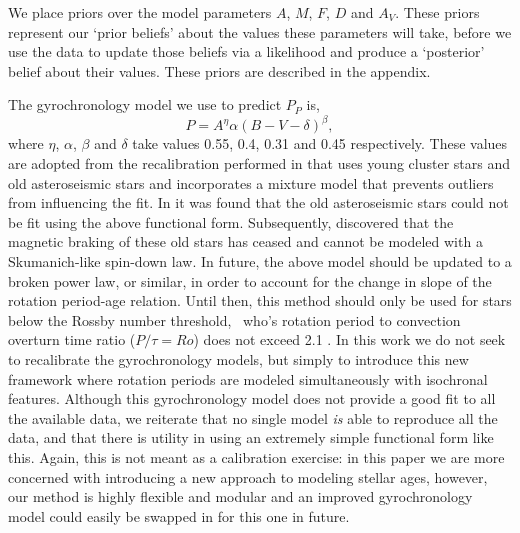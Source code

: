 We place priors over the model parameters $A$, $M$, $F$, $D$ and $A_V$.
These priors represent our `prior beliefs' about the values these parameters
will take, before we use the data to update those beliefs via a likelihood and
produce a `posterior' belief about their values.
These priors are described in the appendix.

The gyrochronology model we use to predict $P_P$ is, %
\begin{equation}
    P = A^\eta \alpha (B-V - \delta)^\beta,
\label{eqn:gyro}
\end{equation}
where $\eta$, $\alpha$, $\beta$ and $\delta$ take values 0.55, 0.4, 0.31 and
0.45 respectively.
These values are adopted from the recalibration performed in \citet{angus2015}
that uses young cluster stars and old asteroseismic stars and incorporates a
mixture model that prevents outliers from influencing the fit.
In \citet{angus2015} it was found that the old asteroseismic stars could not
be fit using the above functional form.
Subsequently, \citet{vansaders2016} discovered that the magnetic braking of
these old stars has ceased and cannot be modeled with a Skumanich-like
spin-down law.
In future, the above model should be updated to a broken power law, or
similar, in order to account for the change in slope of the rotation
period-age relation.
Until then, this method should only be used for stars below the Rossby number
threshold, \ie\ who's rotation period to convection overturn time ratio
($P/\tau = Ro$)
does not exceed 2.1 \citep{vansaders2016}.
In this work we do not seek to recalibrate the gyrochronology models, but
simply to introduce this new framework where rotation periods are modeled
simultaneously with isochronal features.
Although this gyrochronology model does not provide a good fit to all the
available data, we reiterate that no single model {\it is} able to reproduce
all the data, and that there is utility in using an extremely simple
functional form like this.
Again, this is not meant as a calibration exercise: in this paper we are more
concerned with introducing a new approach to modeling stellar ages, however,
our method is highly flexible and modular and an improved gyrochronology model
could easily be swapped in for this one in future.

